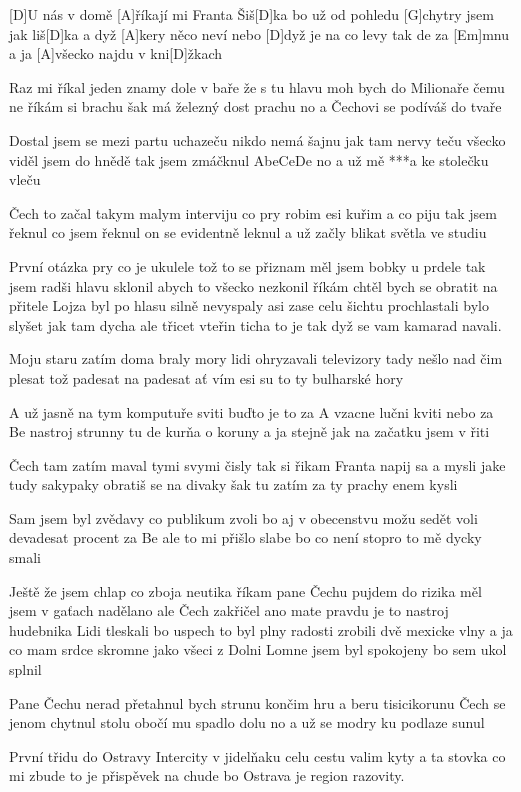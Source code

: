 
[D]U nás v domě [A]\null říkají mi Franta Šiš[D]ka
bo už od pohledu [G]chytry jsem jak liš[D]ka
a dyž [A]kery něco neví
nebo [D]dyž je na co levy
tak de za [Em]mnu a ja [A]všecko najdu v kni[D]\null žkach

Raz mi říkal jeden znamy dole v baře
že s tu hlavu moh bych do Milionaře
čemu ne říkám si brachu
šak má železný dost prachu
no a Čechovi se podíváš do tvaře

Dostal jsem se mezi partu uchazeču
nikdo nemá šajnu jak tam nervy teču
všecko viděl jsem do hnědě
tak jsem zmáčknul AbeCeDe
no a už mě ***a ke stolečku vleču

Čech to začal takym malym interviju
co pry robim esi kuřim a co piju
tak jsem řeknul co jsem řeknul
on se evidentně leknul
a už začly blikat světla ve studiu

První otázka pry co je ukulele
tož to se přiznam měl jsem bobky u prdele
tak jsem radši hlavu sklonil
abych to všecko nezkonil
říkám chtěl bych se obratit na přitele 
\slpc
Lojza byl po hlasu silně nevyspaly
asi zase celu šichtu prochlastali
bylo slyšet jak tam dycha
ale třicet vteřin ticha
to je tak dyž se vam kamarad navali.

Moju staru zatím doma braly mory
lidi ohryzavali televizory
tady nešlo nad čim plesat
tož padesat na padesat
ať vím esi su to ty bulharské hory

A už jasně na tym komputuře sviti
buďto je to za A vzacne lučni kviti
nebo za Be nastroj strunny
tu de kurňa o koruny
a ja stejně jak na začatku jsem v řiti

Čech tam zatím maval tymi svymi čisly
tak si řikam Franta napij sa a mysli
jake tudy sakypaky
obratiš se na divaky
šak tu zatím za ty prachy enem kysli

Sam jsem byl zvědavy co publikum zvoli
bo aj v obecenstvu možu sedět voli
devadesat procent za Be
ale to mi přišlo slabe
bo co není stopro to mě dycky smali

Ještě že jsem chlap co zboja neutika
říkam pane Čechu pujdem do rizika
měl jsem v gaťach nadělano
ale Čech zakřičel ano
mate pravdu je to nastroj hudebnika
\slpc
Lidi tleskali bo uspech to byl plny
radosti zrobili dvě mexicke vlny
a ja co mam srdce skromne
jako všeci z Dolni Lomne
jsem byl spokojeny bo sem ukol splnil

Pane Čechu nerad přetahnul bych strunu
končim hru a beru tisicikorunu
Čech se jenom chytnul stolu
obočí mu spadlo dolu
no a už se modry ku podlaze sunul

První třidu do Ostravy Intercity
v jidelňaku celu cestu valim kyty
a ta stovka co mi zbude
to je přispěvek na chude
bo Ostrava je region razovity.
